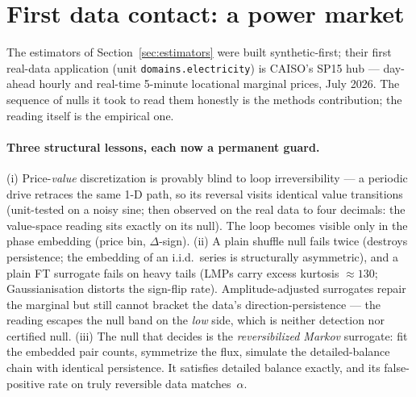 \section{First data contact: a power market}
\label{sec:data}

The estimators of Section~\ref{sec:estimators} were built synthetic-first;
their first real-data application (unit \texttt{domains.electricity}) is
CAISO's SP15 hub --- day-ahead hourly and real-time 5-minute locational
marginal prices, July 2026. The sequence of nulls it took to read them
honestly is the methods contribution; the reading itself is the empirical
one.

\paragraph{Three structural lessons, each now a permanent guard.}
(i) Price-\emph{value} discretization is provably blind to loop
irreversibility --- a periodic drive retraces the same 1-D path, so its
reversal visits identical value transitions (unit-tested on a noisy sine;
then observed on the real data to four decimals: the value-space reading
sits exactly on its null). The loop becomes visible only in the phase
embedding (price bin, $\Delta$-sign). (ii) A plain shuffle null fails twice
(destroys persistence; the embedding of an i.i.d.\ series is structurally
asymmetric), and a plain FT surrogate fails on heavy tails (LMPs carry
excess kurtosis $\approx 130$; Gaussianisation distorts the sign-flip
rate). Amplitude-adjusted surrogates repair the marginal but still cannot
bracket the data's direction-persistence --- the reading escapes the null
band on the \emph{low} side, which is neither detection nor certified null.
(iii) The null that decides is the \emph{reversibilized Markov} surrogate:
fit the embedded pair counts, symmetrize the flux, simulate the
detailed-balance chain with identical persistence. It satisfies detailed
balance exactly, and its false-positive rate on truly reversible data
matches~$\alpha$.

